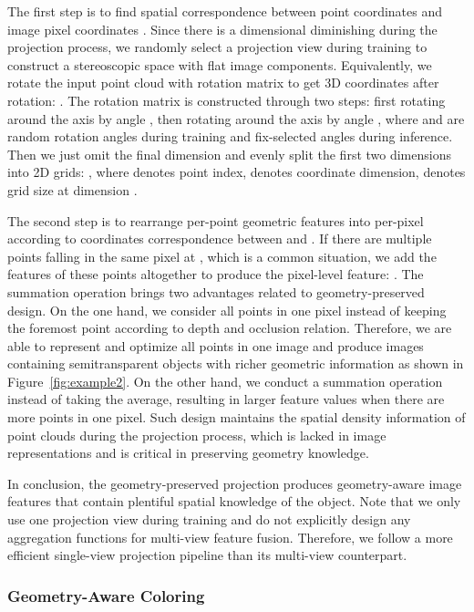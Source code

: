 \documentclass{article}
\begin{document}
The first step is to find spatial correspondence between point coordinates  and image pixel coordinates . Since there is a dimensional diminishing during the projection process, we randomly select a projection view during training to construct a stereoscopic space with flat image components. Equivalently, we rotate the input point cloud with rotation matrix  to get 3D coordinates  after rotation: . The rotation matrix  is constructed through two steps: first rotating around the axis  by angle , then rotating around the axis  by angle , where  and  are random rotation angles during training and fix-selected angles during inference. Then we just omit the final dimension  and evenly split the first two dimensions into 2D grids: , where  denotes point index,  denotes coordinate dimension,  denotes grid size at dimension . 

The second step is to rearrange per-point geometric features  into per-pixel  according to coordinates correspondence between  and . If there are multiple points  falling in the same pixel at , which is a common situation, we add the features of these points altogether to produce the pixel-level feature: . The summation operation brings two advantages related to geometry-preserved design. On the one hand, we consider all points in one pixel instead of keeping the foremost point according to depth and occlusion relation. Therefore, we are able to represent and optimize all points in one image and produce images containing semitransparent objects with richer geometric information as shown in Figure~\ref{fig:example2}. On the other hand, we conduct a summation operation instead of taking the average, resulting in larger feature values when there are more points in one pixel. Such design maintains the spatial density information of point clouds during the projection process, which is lacked in image representations and is critical in preserving geometry knowledge.

In conclusion, the geometry-preserved projection produces geometry-aware image features that contain plentiful spatial knowledge of the object. Note that we only use one projection view during training and do not explicitly design any aggregation functions for multi-view feature fusion. Therefore, we follow a more efficient single-view projection pipeline than its multi-view counterpart.


\subsubsection{Geometry-Aware Coloring}
\label{sec:color}
\end{document}
